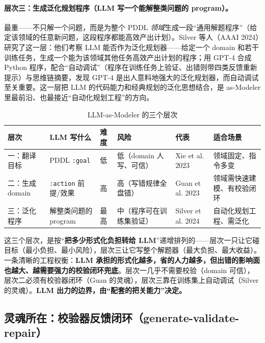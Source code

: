\paragraph{层次三：生成泛化规划程序（LLM 写一个能解整类问题的 program）。}
最重——不只解一个问题，而是为整个 PDDL \emph{领域}生成一段“通用解题程序”（给定该领域的任意新问题，这段程序都能高效产出计划）。Silver 等人（AAAI 2024）研究了这一层：他们考察 LLM 能否作为泛化规划器——给定一个 domain 和若干训练任务，生成一个能为该领域其他任务高效产出计划的程序；用 GPT-4 合成 Python 程序，配合“自动调试”（程序在训练任务上验证、出错则带四类反馈重新提示）与思维链摘要，发现 GPT-4 是出人意料地强大的泛化规划器，而自动调试至关重要\cite{silver2024generalized}。这一层把 LLM 的代码能力和经典规划的泛化思想结合，是 as-Modeler 里最前沿、也最接近“自动化规划工程”的方向。

\begin{table}[H]\centering\small
\caption{LLM-as-Modeler 的三个层次}
\label{tab:modeler-levels}
\begin{tabular}{p{1.6cm}p{2.6cm}p{1.0cm}p{2.8cm}p{2.0cm}p{2.6cm}}
\toprule
层次 & LLM 写什么 & 难度 & 风险 & 代表 & 适合场景 \\
\midrule
一：翻译目标 & PDDL \texttt{:goal} & 低 & 低（domain 人写、可信） & Xie et al. 2023 & 领域固定、指令多变 \\
二：生成 domain & \texttt{:action} 前提/效果 & 高 & 高（写错规律全盘错） & Guan et al. 2023 & 领域需快速建模、有校验闭环 \\
三：泛化程序 & 解整类问题的 program & 最高 & 中（程序可在训练集验证） & Silver et al. 2024 & 自动化规划工程、需泛化 \\
\bottomrule
\end{tabular}
\end{table}

\begin{insight}
这三个层次，是按“\textbf{把多少形式化负担转给 LLM}”递增排列的——层次一只让它碰目标（最小负担、最小风险），层次三让它写整个解题器（最大负担、最大收益）。一条清晰的工程权衡：\textbf{LLM 承担的形式化越多，省的人力越多，但出错的影响面也越大、越需要强力的校验闭环兜底}。层次一几乎不需要校验（domain 可信），层次二必须有校验器闭环（Guan 的灵魂），层次三靠在训练集上自动调试（Silver 的灵魂）。\textbf{LLM 出力的边界，由“配套的把关能力”决定。}
\end{insight}

\subsection{灵魂所在：校验器反馈闭环（generate-validate-repair）}
\label{sec:modeler-loop}

